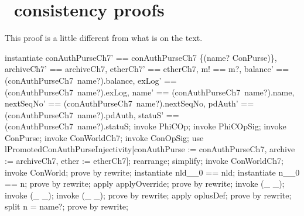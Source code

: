 \section{\Conc\ consistency proofs}

This proof is a little different from what is on the text.

\begin{LPScript}\begin{zproof}[tPhiCOpPRE]
    instantiate conAuthPurseCh7' == conAuthPurseCh7
        \oplus  \{(name? \mapsto  \theta  ConPurse)\},
        archiveCh7' == archiveCh7, etherCh7' == etherCh7,
        m! == m?, balance' == (conAuthPurseCh7~name?).balance,
        exLog' == (conAuthPurseCh7~name?).exLog,
        name' == (conAuthPurseCh7~name?).name,
        nextSeqNo' == (conAuthPurseCh7~name?).nextSeqNo,
        pdAuth' == (conAuthPurseCh7~name?).pdAuth,
        statuS' == (conAuthPurseCh7~name?).statuS;
    invoke PhiCOp;
    invoke PhiCOpSig;
    invoke \Delta ConPurse;
    invoke \Delta ConWorldCh7;
    invoke ConOpSig;
    use lPromotedConAuthPurseInjectivity[conAuthPurse := conAuthPurseCh7,
        archive := archiveCh7, ether := etherCh7];
    rearrange;
    simplify;
    invoke ConWorldCh7;
    invoke ConWorld;
    prove by rewrite;
    instantiate nld\_\_0 == nld;
    instantiate n\_\_0 == n;
    prove by rewrite;
    apply applyOverride;
    prove by rewrite;
    invoke (\_ \finj \_);
    invoke (\_ \pinj \_);
    invoke (\_ \ffun \_);
    prove by rewrite;
    apply oplusDef;
    prove by rewrite;
    split n = name?;
    prove by rewrite;
\end{zproof}\end{LPScript}

